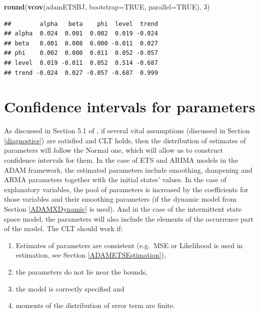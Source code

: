 \documentclass[]{book}
\newenvironment{Shaded}{\begin{snugshade}}{\end{snugshade}}
\newcommand{\DataTypeTok}[1]{\textcolor[rgb]{0.13,0.29,0.53}{#1}}
\newcommand{\DecValTok}[1]{\textcolor[rgb]{0.00,0.00,0.81}{#1}}
\newcommand{\KeywordTok}[1]{\textcolor[rgb]{0.13,0.29,0.53}{\textbf{#1}}}
\newcommand{\NormalTok}[1]{#1}
\newcommand{\OtherTok}[1]{\textcolor[rgb]{0.56,0.35,0.01}{#1}}
\providecommand{\tightlist}{%
  \setlength{\itemsep}{0pt}\setlength{\parskip}{0pt}}
\theoremstyle{definition}
\theoremstyle{definition}
\theoremstyle{definition}
\theoremstyle{definition}
\theoremstyle{remark}
\begin{document}
\begin{Shaded}
\begin{Highlighting}[]
\KeywordTok{round}\NormalTok{(}\KeywordTok{vcov}\NormalTok{(adamETSBJ, }\DataTypeTok{bootstrap=}\OtherTok{TRUE}\NormalTok{, }\DataTypeTok{parallel=}\OtherTok{TRUE}\NormalTok{), }\DecValTok{3}\NormalTok{)}
\end{Highlighting}
\end{Shaded}

\begin{verbatim}
##        alpha   beta    phi  level  trend
## alpha  0.024  0.001  0.002  0.019 -0.024
## beta   0.001  0.008  0.000 -0.011  0.027
## phi    0.002  0.000  0.011  0.052 -0.057
## level  0.019 -0.011  0.052  0.514 -0.687
## trend -0.024  0.027 -0.057 -0.687  0.999
\end{verbatim}

\hypertarget{confidence-intervals-for-parameters}{%
\section{Confidence intervals for parameters}\label{confidence-intervals-for-parameters}}

As discussed in Section 5.1 of \citet{SvetunkovSBA}, if several vital assumptions (discussed in Section \ref{diagnostics}) are satisfied and CLT holds, then the distribution of estimates of parameters will follow the Normal one, which will allow us to construct confidence intervals for them. In the case of ETS and ARIMA models in the ADAM framework, the estimated parameters include smoothing, dampening and ARMA parameters together with the initial states' values. In the case of explanatory variables, the pool of parameters is increased by the coefficients for those variables and their smoothing parameters (if the dynamic model from Section \ref{ADAMXDynamic} is used). And in the case of the intermittent state space model, the parameters will also include the elements of the occurrence part of the model. The CLT should work if:

\begin{enumerate}
\def\labelenumi{\arabic{enumi}.}
\tightlist
\item
  Estimates of parameters are consistent (e.g.~MSE or Likelihood is used in estimation, see Section \ref{ADAMETSEstimation}),
\item
  the parameters do not lie near the bounds,
\item
  the model is correctly specified and
\item
  moments of the distribution of error term are finite.
\end{enumerate}
\end{document}
